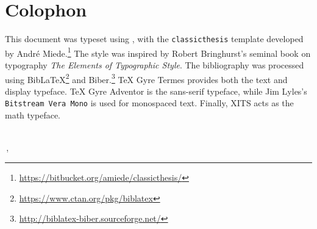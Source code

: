 \pagestyle{empty}

\hfill

\vfill


\section*{Colophon}
This document was typeset using \LuaLaTeX, with the
\texttt{classicthesis} template developed by André Miede.\footnote{\url{https://bitbucket.org/amiede/classicthesis/}}
The style was inspired by Robert Bringhurst's seminal book on typography
\emph{The Elements of Typographic Style}.\autocite{Bringhurst2004-wn}
The bibliography was processed using
Bib\LaTeX\footnote{\url{https://www.ctan.org/pkg/biblatex}} and
Biber.\footnote{\url{http://biblatex-biber.sourceforge.net/}}
TeX Gyre Termes provides both the text and display typeface.
\textsf{TeX Gyre Adventor} is the sans-serif typeface, while Jim Lyles's
\texttt{Bitstream Vera Mono} is used for monospaced text.
Finally, XITS acts as the math typeface.

\bigskip
{\small
\noindent\textit{\myTitle}
\\
\noindent\textcopyright\,\finalVersion, \myName
}

%
%




